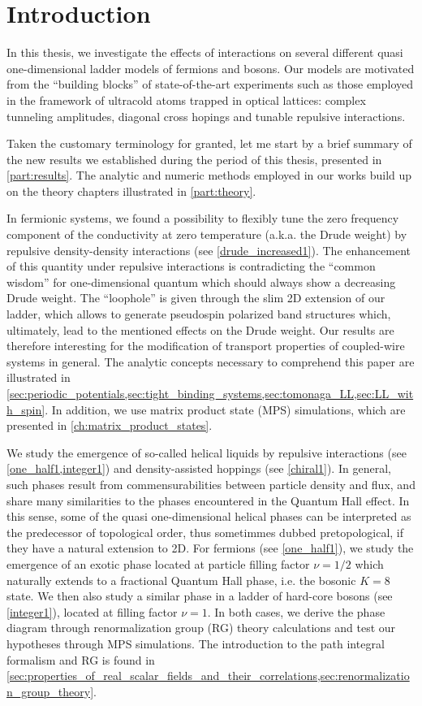 
\chapter*{Introduction}
In this thesis, we investigate the effects of interactions on several different quasi one-dimensional ladder models of fermions and bosons.
Our models are motivated from the ``building blocks'' of state-of-the-art experiments such as those employed in the framework of ultracold atoms trapped in optical lattices: complex tunneling amplitudes, diagonal cross hopings and tunable repulsive interactions.

Taken the customary terminology for granted, let me start by a brief summary of the new results we established during the period of this thesis, presented in \cref{part:results}.
The analytic and numeric methods employed in our works build up on the theory chapters illustrated in \cref{part:theory}.

In fermionic systems, we found a possibility to flexibly tune the zero frequency component of the conductivity at zero temperature (a.k.a. the Drude weight) by repulsive density-density interactions (see \cref{drude_increased1}).
The enhancement of this quantity under repulsive interactions is contradicting the ``common wisdom'' for one-dimensional quantum which should always show a decreasing Drude weight.
The ``loophole'' is given through the slim 2D extension of our ladder, which allows to generate pseudospin polarized band structures which, ultimately, lead to the mentioned effects on the Drude weight.
Our results are therefore interesting for the modification of transport properties of coupled-wire systems in general.
The analytic concepts necessary to comprehend this paper are illustrated in \cref{sec:periodic_potentials,sec:tight_binding_systems,sec:tomonaga_LL,sec:LL_with_spin}.
In addition, we use matrix product state (MPS) simulations, which are presented in \cref{ch:matrix_product_states}.

We study the emergence of so-called helical liquids by repulsive interactions (see \cref{one_half1,integer1}) and density-assisted hoppings (see \cref{chiral1}).
In general, such phases result from commensurabilities between particle density and flux, and share many similarities to the phases encountered in the Quantum Hall effect.
In this sense, some of the quasi one-dimensional helical phases can be interpreted as the predecessor of topological order, thus sometimmes dubbed pretopological, if they have a natural extension to 2D.
For fermions (see \cref{one_half1}), we study the emergence of an exotic phase located at particle filling factor $\nu=1/2$ which naturally extends to a fractional Quantum Hall phase, i.e. the bosonic $K=8$ state.
We then also study a similar phase in a ladder of hard-core bosons (see \cref{integer1}), located at filling factor $\nu=1$.
In both cases, we derive the phase diagram through renormalization group (RG) theory calculations and test our hypotheses through MPS simulations.
The introduction to the path integral formalism and RG is found in \cref{sec:properties_of_real_scalar_fields_and_their_correlations,sec:renormalization_group_theory}.

